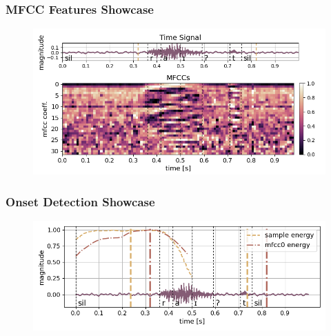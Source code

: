 \begin{frame}
  \frametitle{MFCC Features Showcase}
  \begin{figure} \includegraphics[width=1.0\textwidth]{../3_signal/figs/signal_mfcc_showcase_mfcc32_right0.png} \end{figure}
\end{frame}

\begin{frame}
  \frametitle{Onset Detection Showcase}
  \begin{figure} \includegraphics[width=1.0\textwidth]{../3_signal/figs/signal_onset_showcase_right0.png} \end{figure}
\end{frame}